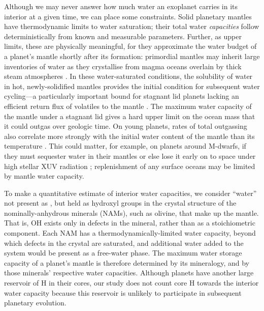 \documentclass[fleqn,usenatbib]{mnras}
\begin{document}
Although we may never answer how much water an exoplanet carries in its interior at a given time, we can place some constraints. Solid planetary mantles have thermodynamic limits to water saturation; their total water \textit{capacities} follow deterministically from known and measurable parameters. Further, as upper limits, these are physically meaningful, for they approximate the water budget of a planet's mantle shortly after its formation: primordial mantles may inherit large inventories of water as they crystallise from magma oceans overlain by thick steam atmospheres \citep{tikoo_fate_2017, dorn_hidden_2021, bower_retention_2021, miyazaki_wet_2022, salvador_convective_2023}. In these water-saturated conditions, the solubility of water in hot, newly-solidified mantles provides the initial condition for subsequent water cycling---a particularly important bound for stagnant lid planets lacking an efficient return flux of volatiles to the mantle \citep[e.g.,][]{foley_carbon_2018}. The maximum water capacity of the mantle under a stagnant lid gives a hard upper limit on the ocean mass that it could outgas over geologic time. On young planets, rates of total outgassing also correlate more strongly with the initial water content of the mantle than its temperature \citep{guimond_low_2021}. This could matter, for example, on planets around M-dwarfs, if they must sequester water in their mantles or else lose it early on to space under high stellar XUV radiation \citep{wordsworth_water_2013, luger_extreme_2015, godolt_habitability_2019, fleming_xuv_2020, moore_keeping_2020}; replenishment of any surface oceans may be limited by mantle water capacity.


To make a quantitative estimate of interior water capacities, we consider ``water'' not present as , but held as hydroxyl groups in the crystal structure of the nominally-anhydrous minerals (NAMs), such as olivine, that make up the mantle. That is, OH exists only in defects in the mineral, rather than as a stoichiometric component. Each NAM has a thermodynamically-limited water capacity, beyond which defects in the crystal are saturated, and additional water added to the system would be present as a free-water phase. The maximum water storage capacity of a planet's mantle is therefore determined by its mineralogy, and by those minerals' respective water capacities. Although planets have another large reservoir of H in their cores, our study does not count core H towards the interior water capacity because this reservoir is unlikely to participate in subsequent planetary evolution.
\end{document}
